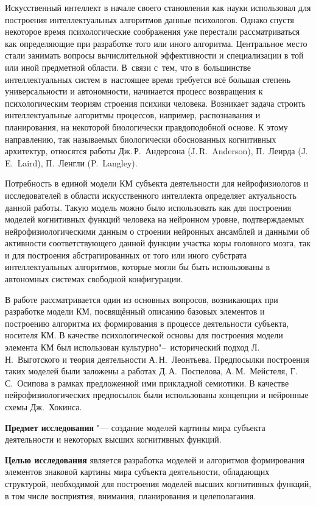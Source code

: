 Искусственный интеллект в начале своего становления как науки использовал для построения интеллектуальных алгоритмов данные психологов. Однако спустя некоторое время психологические соображения уже перестали рассматриваться как определяющие при разработке того или иного алгоритма. Центральное место стали занимать вопросы вычислительной эффективности и специализации в той или иной предметной области. В~связи с~тем, что в~большинстве интеллектуальных систем в~настоящее время требуется всё большая степень универсальности и автономности, начинается процесс возвращения к психологическим теориям строения психики человека. Возникает задача строить интеллектуальные алгоритмы процессов, например, распознавания и планирования, на некоторой биологически правдоподобной основе. К этому направлению, так называемых биологически обоснованных когнитивных архитектур, относятся работы Дж.\,Р.~Андерсона (J.\,R.~Anderson), П.~Леирда (J.\,E.~Laird), П.~Ленгли (P.~Langley).

Потребность в единой модели КМ субъекта деятельности для нейрофизиологов и исследователей в области искусственного интеллекта определяет актуальность данной работы. Такую модель можно было использовать как для построения моделей когнитивных функций человека на нейронном уровне, подтверждаемых нейрофизиологическими данным о строении нейронных ансамблей и данными об активности соответствующего данной функции участка коры головного мозга, так и для построения абстрагированных от того или иного субстрата интеллектуальных алгоритмов, которые могли бы быть использованы в автономных системах свободной конфигурации.

В работе рассматривается один из основных вопросов, возникающих при разработке модели КМ, посвящённый описанию базовых элементов и построению алгоритма их формирования в процессе деятельности субъекта, носителя КМ. В качестве психологической основы для построения модели элемента КМ был использован культурно"--~исторический подход Л.\,Н.~Выготского и теория деятельности А.\,Н.~Леонтьева. Предпосылки построения таких моделей были заложены а работах Д.\,А.~Поспелова, А.\,М.~Мейстеля, Г.\,С.~Осипова в рамках предложенной ими прикладной семиотики. В качестве нейрофизиологических предпосылок были использованы концепции и нейронные схемы Дж.~Хокинса.

\textbf{Предмет исследования} "--- создание моделей картины мира субъекта деятельности и некоторых высших когнитивных функций.

\textbf{Целью исследования} является разработка моделей и алгоритмов формирования элементов знаковой картины мира субъекта деятельности, обладающих структурой, необходимой для построения моделей высших когнитивных функций, в том числе восприятия, внимания, планирования и целеполагания.

